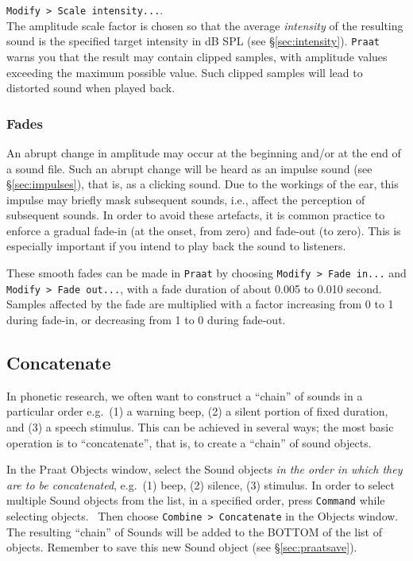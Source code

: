 \documentclass[
]{book}
\begin{document}
\texttt{Modify\ \textgreater{}\ Scale\ intensity...}.\\
The amplitude scale factor is chosen so that the average \emph{intensity} of the resulting sound is the specified target intensity in dB SPL (see §\ref{sec:intensity}). \texttt{Praat} warns you that the result may contain clipped samples, with amplitude values exceeding the maximum possible value. Such clipped samples will lead to distorted sound when played back.

\label{fades}
\subsubsection{Fades}\label{sec:fades}

An abrupt change in amplitude may occur at the beginning and/or at the end of a sound file. Such an abrupt change will be heard as an impulse sound (see §\ref{sec:impulses}), that is, as a clicking sound. Due to the workings of the ear, this impulse may briefly mask subsequent sounds, i.e., affect the perception of subsequent sounds. In order to avoid these artefacts, it is common practice to enforce a gradual fade-in (at the onset, from zero) and fade-out (to zero). This is especially important if you intend to play back the sound to listeners.

\label{box-praatfades}
These smooth fades can be made in \texttt{Praat} by choosing \texttt{Modify\ \textgreater{}\ Fade\ in...} and \texttt{Modify\ \textgreater{}\ Fade\ out...}, with a fade duration of about 0.005 to 0.010 second. Samples affected by the fade are multiplied with a factor increasing from 0 to 1 during fade-in, or decreasing from 1 to 0 during fade-out.

\subsection{Concatenate}\label{sec:concatenate}

In phonetic research, we often want to construct a ``chain'' of sounds in a particular order e.g.~(1) a warning beep, (2) a silent portion of fixed duration, and (3) a speech stimulus. This can be achieved in several ways; the most basic operation is to ``concatenate'', that is, to create a ``chain'' of sound objects.

\label{box-praatconcatenate}
In the Praat Objects window, select the Sound objects \emph{in the order in which they are to be concatenated}, e.g.~(1) beep, (2) silence, (3) stimulus. In order to select multiple Sound objects from the list, in a specified order, press \texttt{Command} while selecting objects.~
Then choose \texttt{Combine\ \textgreater{}\ Concatenate} in the Objects window. The resulting ``chain'' of Sounds will be added to the BOTTOM of the list of objects. Remember to save this new Sound object (see §\ref{sec:praatsave}).
\end{document}
